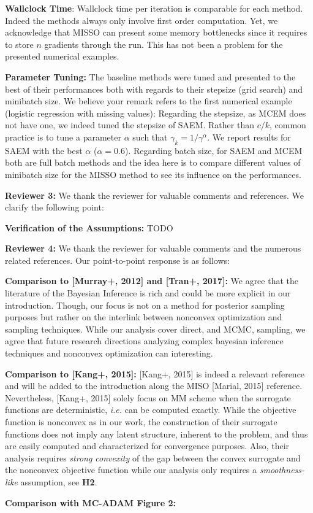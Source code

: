 \documentclass{article}
\begin{document}
\textbf{Wallclock Time}:
Wallclock time per iteration is comparable for each method. Indeed the methods always only involve first order computation. Yet, we acknowledge that MISSO can present some memory bottlenecks since it requires to store $n$ gradients through the run. This has not been a problem for the presented numerical examples.

\textbf{Parameter Tuning:}
The baseline methods were tuned and presented to the best of their performances both with regards to their stepsize (grid search) and minibatch size.
We believe your remark refers to the first numerical example (logistic regression with missing values): Regarding the stepsize, as MCEM does not have one, we indeed tuned the stepsize of SAEM. Rather than $c/k$, common practice is to tune a parameter $\alpha$ such that $\gamma_k = 1/\gamma^{\alpha}$. We report results for SAEM with the best $\alpha$ ($\alpha = 0.6$). Regarding batch size, for SAEM and MCEM both are full batch methods and the idea here is to compare different values of minibatch size for the MISSO method to see its influence on the performances.



\textbf{\textcolor{yellow!80!black}{Reviewer 3:}} We thank the reviewer for valuable comments and references. We clarify the following point:

\textbf{Verification of the Assumptions:} {\color{red} TODO }



\textbf{\textcolor{green!50!black}{Reviewer 4:}} We thank the reviewer for valuable comments and the numerous related references. Our point-to-point response is as follows:

\textbf{Comparison to [Murray+, 2012] and [Tran+, 2017]:} We agree that the literature of the Bayesian Inference is rich and could be more explicit in our introduction. Though, our focus is not on a method for posterior sampling purposes but rather on the interlink between nonconvex optimization and sampling techniques. While our analysis cover direct, and MCMC, sampling, we agree that future research directions analyzing complex bayesian inference techniques and nonconvex optimization can interesting.

\textbf{Comparison to [Kang+, 2015]:} [Kang+, 2015] is indeed a relevant reference and will be added to the introduction along the MISO [Marial, 2015] reference.
Nevertheless, [Kang+, 2015] solely focus on MM scheme when the surrogate functions are deterministic, \textit{i.e.} can be computed exactly. 
While the objective function is nonconvex as in our work, the construction of their surrogate functions does not imply any latent structure, inherent to the problem, and thus are easily computed and characterized for convergence purposes. Also, their analysis requires \emph{strong convexity} of the gap between the convex surrogate and the nonconvex objective function while our analysis only requires a \emph{smoothness-like} assumption, see \textbf{H2}.

\textbf{Comparison with MC-ADAM Figure 2:}
\end{document}
